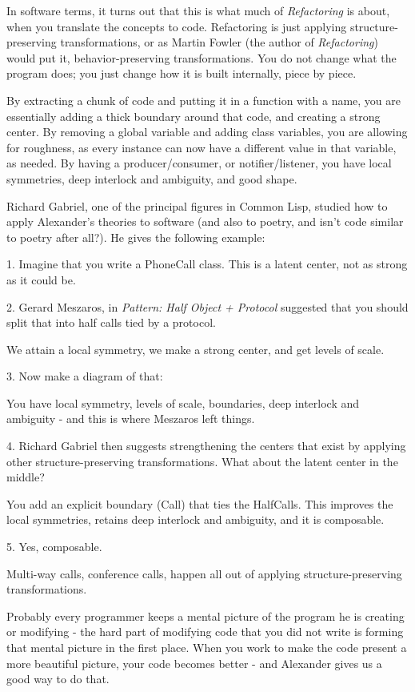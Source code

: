 In software terms, it turns out that this is what much of \textit{Refactoring} is about, when you translate the concepts to code. Refactoring is just applying structure-preserving transformations, or as Martin Fowler (the author of \textit{Refactoring}) would put it, behavior-preserving transformations. You do not change what the program does; you just change how it is built internally, piece by piece.

By extracting a chunk of code and putting it in a function with a name, you are essentially adding a thick boundary around that code, and creating a strong center. By removing a global variable and adding class variables, you are allowing for roughness, as every instance can now have a different value in that variable, as needed. By having a producer/consumer, or notifier/listener, you have local symmetries, deep interlock and ambiguity, and good shape.

Richard Gabriel, one of the principal figures in Common Lisp, studied how to apply Alexander's theories to software (and also to poetry, and isn't code similar to poetry after all?).  He gives the following example:

1. Imagine that you write a PhoneCall class. This is a latent center, not as strong as it could be.

2. Gerard Meszaros, in \textit{Pattern: Half Object + Protocol} suggested that you should split that into half calls tied by a protocol.

We attain a local symmetry, we make a strong center, and get levels of scale.

3. Now make a diagram of that:

You have local symmetry, levels of scale, boundaries, deep interlock and ambiguity - and this is where Meszaros left things.

4. Richard Gabriel then suggests strengthening the centers that exist by applying other structure-preserving transformations. What about the latent center in the middle?

You add an explicit boundary (Call) that ties the HalfCalls. This improves the local symmetries, retains deep interlock and ambiguity, and it is composable.

5. Yes, composable.

Multi-way calls, conference calls, happen all out of applying structure-preserving transformations.

Probably every programmer keeps a mental picture of the program he is creating or modifying - the hard part of modifying code that you did not write is forming that mental picture in the first place. When you work to make the code present a more beautiful picture, your code becomes better - and Alexander gives us a good way to do that.

